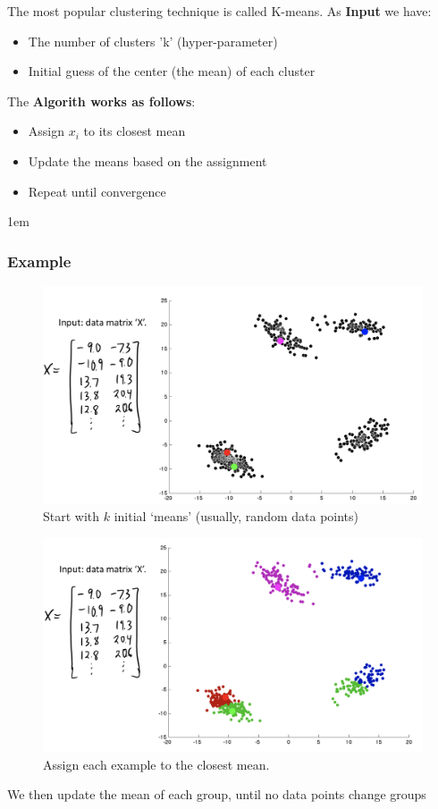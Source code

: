 \documentclass{article}
\def\blu#1{{\color{blu}#1}}
\theoremstyle{definition}
\begin{document}
The most popular clustering technique is called K-means. As \textbf{Input} we have:
\begin{itemize}
	\item The \blu{number of clusters 'k' (hyper-parameter)}
	\item \blu{Initial guess of the center (the mean) of each cluster}
\end{itemize}
The \textbf{Algorith works as follows}:
\begin{itemize}
	\item \blu{Assign $ x_i $} to its closest mean
	\item \blu{Update the means} based on the assignment 
	\item Repeat until convergence
\end{itemize}
\begingroup
\leftskip1em
\subsubsection*{Example}

\begin{figure}[H]
	\centering
	\includegraphics[width = 4.5in]{Pic7}
	\caption{Start with $ k $ initial ‘means’ (usually, random data points)}
\end{figure}
\begin{figure}[H]
	\centering
	\includegraphics[width = 4.5in]{Pic8}
	\caption{Assign each example to the closest mean.}
\end{figure}
We then update the mean of each group, until no data points change groups 
\endgroup
\end{document}
